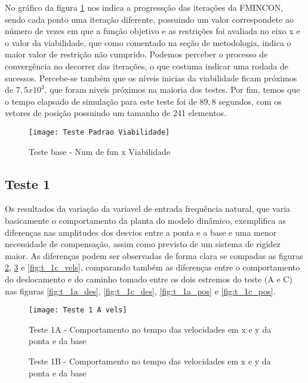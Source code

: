 No gráfico da figura \ref{fig:t_padr_viab} nos indica a progressção das iterações da FMINCON, sendo cada
ponto uma iteração diferente, possuindo um valor correspondete ao número de vezes em que a função objetivo e as restrições foi avaliada
no eixo x e o valor da viabilidade, que como comentado na seção de metodologia, indica o maior valor de restrição não cumprido.
Podemos perceber o processo de convergência no decorrer das iterações, o que costuma indicar uma rodada de sucessos.
Percebe-se também que os níveis inicias da viabilidade ficam próximos de $7,5x10^3$, que foram niveis próximos na maioria dos testes.
Por fim, temos que o tempo elapsado de simulação para este teste foi de $89,8$ segundos, com os vetores de posição possuindo
um tamanho de 241 elementos.

\begin{figure}[!htb]
    \begin{center}
    \caption{Teste base - Num de fun x Viabilidade}
    \texttt{[image: Teste Padrao Viabilidade]}
    \label{fig:t_padr_viab}
    \end{center}
\end{figure}

\subsection{Teste 1}
Os resultados da variação da variavel de entrada frequência natural, que varia basicamente o comportamento da planta do
modelo dinâmico, exemplifica as diferenças nas amplitudes dos desvios entre a ponta e a base e uma menor necessidade de compensação, assim como previsto
de um sistema de rigidez maior.
As diferenças podem ser observadas de forma clara se compadas as figuras \ref{fig:t_1a_vels}, \ref{fig:t_1b_vels} e \ref{fig:t_1c_vels},
comparando também as diferenças entre o comportamento do deslocamento e do caminho tomado entre os dois estremos do teste (A e C) nas figuras
\ref{fig:t_1a_des}, \ref{fig:t_1c_des}, \ref{fig:t_1a_pos} e \ref{fig:t_1c_pos}.

\begin{figure}[!htb]
    \begin{center}
    \caption{Teste 1A - Comportamento no tempo das velocidades em x e y da ponta e da base}
    \texttt{[image: Teste 1 A vels]}
    \label{fig:t_1a_vels}
    \end{center}
\end{figure}

\begin{figure}[!htb]
    \begin{center}
    \caption{Teste 1B - Comportamento no tempo das velocidades em x e y da ponta e da base}
    \label{fig:t_1b_vels}
    \end{center}
\end{figure}

